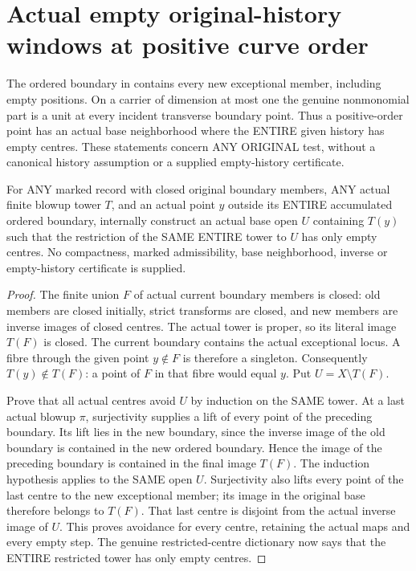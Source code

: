 \section{Actual empty original-history windows at positive curve order}

The ordered boundary in \cite[Section~5, Step~II]{bierstone-milman08-functoriality}
contains every new exceptional member, including empty positions. On a
carrier of dimension at most one the genuine nonmonomial part is a unit
at every incident transverse boundary point. Thus a positive-order point
has an actual base neighborhood where the ENTIRE given history has empty
centres. These statements concern ANY ORIGINAL test, without a canonical
history assumption or a supplied empty-history certificate.

\begin{theorem}
\label{hir:original-off-boundary-actual-empty-history-window}
\leanok
For ANY marked record with closed original boundary members, ANY actual
finite blowup tower $T$, and an actual point $y$ outside its ENTIRE
accumulated ordered boundary, internally construct an actual base open
$U$ containing $T(y)$ such that the restriction of the SAME ENTIRE tower
to $U$ has only empty centres. No compactness, marked admissibility,
base neighborhood, inverse or empty-history certificate is supplied.
\end{theorem}
\begin{proof}
The finite union $F$ of actual current boundary members is closed: old
members are closed initially, strict transforms are closed, and new
members are inverse images of closed centres. The actual tower is proper,
so its literal image $T(F)$ is closed. The current boundary contains the
actual exceptional locus. A fibre through the given point $y\notin F$
is therefore a singleton. Consequently $T(y)\notin T(F)$: a point of $F$
in that fibre would equal $y$. Put $U=X\setminus T(F)$.

Prove that all actual centres avoid $U$ by induction on the SAME tower.
At a last actual blowup $\pi$, surjectivity supplies a lift of every point
of the preceding boundary. Its lift lies in the new boundary, since the
inverse image of the old boundary is contained in the new ordered
boundary. Hence the image of the preceding boundary is contained in the
final image $T(F)$. The induction hypothesis applies to the SAME open
$U$. Surjectivity also lifts every point of the last centre to the new
exceptional member; its image in the original base therefore belongs to
$T(F)$. That last centre is disjoint from the actual inverse image of
$U$. This proves avoidance for every centre, retaining the actual maps
and every empty step. The genuine restricted-centre dictionary now says
that the ENTIRE restricted tower has only empty centres.
\end{proof}

